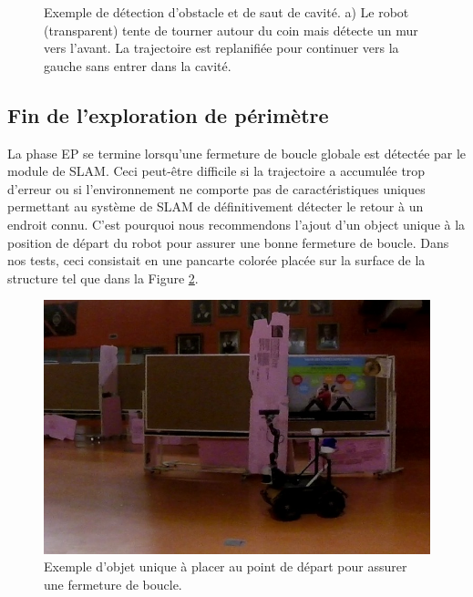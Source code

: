 \begin{figure}[ht]
\centering
{}
\hfil
{}
\caption{
Exemple de détection d'obstacle et de saut de cavité. a) Le robot (transparent) tente de tourner autour du coin mais détecte un mur vers l'avant. La trajectoire est replanifiée pour continuer vers la gauche sans entrer dans la cavité.}
\label{fig:ugv_exploration}
\end{figure}

\subsection{Fin de l'exploration de périmètre}

La phase EP se termine lorsqu'une fermeture de boucle globale est détectée par le module de SLAM. Ceci peut-être difficile si la trajectoire a accumulée trop d'erreur ou si l'environnement ne comporte pas de caractéristiques uniques permettant au système de SLAM de définitivement détecter le retour à un endroit connu. C'est pourquoi nous recommendons l'ajout d'un object unique à la position de départ du robot pour assurer une bonne fermeture de boucle. Dans nos tests, ceci consistait en une pancarte colorée placée sur la surface de la structure tel que dans la Figure \ref{fig:ugv_pancarte}.

\begin{figure}[ht]
  \centering
  \includegraphics[width=0.5\linewidth]{images/ugv_unique.jpg}
  \caption{Exemple d'objet unique à placer au point de départ pour assurer une fermeture de boucle.}
  \label{fig:ugv_pancarte}
\end{figure}

